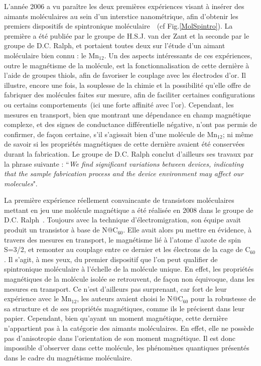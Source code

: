 L'année 2006 a vu paraître les deux premières expériences visant à insérer des aimants moléculaires au sein d'un interstice nanométrique, afin d'obtenir les premiers dispositifs de spintronique moléculaire~\cite{Heersche2006,Jo2006}~(cf Fig.\ref{MolSpintro}). La première a été publiée par le groupe de H.S.J. van der Zant et la seconde par le groupe de D.C. Ralph, et portaient toutes deux sur l'étude d'un aimant moléculaire bien connu : le Mn$_{12}$. Un des aspects intéressants de ces expériences, outre le magnétisme de la molécule, est la fonctionnalisation de cette dernière à l'aide de groupes thiols, afin de favoriser le couplage avec les électrodes d'or. Il illustre, encore une fois, la souplesse de la chimie et la possibilité qu'elle offre de fabriquer des molécules faites sur mesure, afin de faciliter certaines configurations ou certains comportements~(ici une forte affinité avec l'or).  
Cependant, les mesures en transport, bien que montrant une dépendance en champ magnétique complexe, et des signes de conductance différentielle négative, n'ont pas permis de confirmer, de façon certaine, s'il s'agissait bien d'une molécule de Mn$_{12}$; ni même de savoir si les propriétés magnétiques de cette dernière avaient été conservées durant la fabrication. Le groupe de D.C. Ralph conclut d'ailleurs ses travaux par la phrase suivante : ``\textit{We find significant variations between devices, indicating that the sample fabrication process and the device environment may affect our molecules}".

La première expérience réellement convaincante de transistors moléculaires mettant en jeu une molécule magnétique a été réalisée en 2008 dans le groupe de D.C. Ralph~\cite{Grose2008}. Toujours avec la technique d'électromigration, son équipe avait produit un transistor à base de N@C$_{60}$. Elle avait alors pu mettre en évidence, à travers des mesures en transport, le magnétisme lié à l'atome d'azote de spin S=3/2,  et remonter au couplage entre ce dernier et les électrons de la cage de C$_{60}$. 
Il s'agit, à mes yeux, du premier dispositif que l'on peut qualifier de spintronique moléculaire à l'échelle de la molécule unique. En effet, les propriétés magnétiques de la molécule isolée se retrouvent, de façon non équivoque, dans les mesures en transport. Ce n'est d'ailleurs pas surprenant, car fort de leur expérience avec le Mn$_{12}$, les auteurs avaient choisi le N@C$_{60}$ pour la robustesse de sa structure et de ses propriétés magnétiques, comme ils le précisent dans leur papier.
Cependant, bien qu'ayant un moment magnétique, cette dernière n'appartient pas à la catégorie des aimants moléculaires. En effet, elle ne possède pas d'anisotropie dans l'orientation de son moment magnétique. Il est donc impossible d'observer dans cette molécule, les phénomènes quantiques présentés dans le cadre du magnétisme moléculaire.


